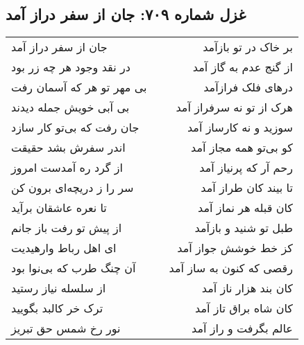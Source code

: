 \begin{center}
\section*{غزل شماره ۷۰۹: جان از سفر دراز آمد}
\label{sec:0709}
\begin{longtable}{l p{0.5cm} r}
جان از سفر دراز آمد
&&
بر خاک در تو بازآمد
\\
در نقد وجود هر چه زر بود
&&
از گنج عدم به گاز آمد
\\
بی مهر تو هر که آسمان رفت
&&
درهای فلک فرازآمد
\\
بی آبی خویش جمله دیدند
&&
هرک از تو نه سرفراز آمد
\\
جان رفت که بی‌تو کار سازد
&&
سوزید و نه کارساز آمد
\\
اندر سفرش بشد حقیقت
&&
کو بی‌تو همه مجاز آمد
\\
از گرد ره آمدست امروز
&&
رحم آر که پرنیاز آمد
\\
سر را ز دریچه‌ای برون کن
&&
تا بیند کان طراز آمد
\\
تا نعره عاشقان برآید
&&
کان قبله هر نماز آمد
\\
از پیش تو رفت باز جانم
&&
طبل تو شنید و بازآمد
\\
ای اهل رباط وارهیدیت
&&
کز خط خوشش جواز آمد
\\
آن چنگ طرب که بی‌نوا بود
&&
رقصی که کنون به ساز آمد
\\
از سلسله نیاز رستید
&&
کان بند هزار ناز آمد
\\
ترک خر کالبد بگویید
&&
کان شاه براق تاز آمد
\\
نور رخ شمس حق تبریز
&&
عالم بگرفت و راز آمد
\\
\end{longtable}
\end{center}
